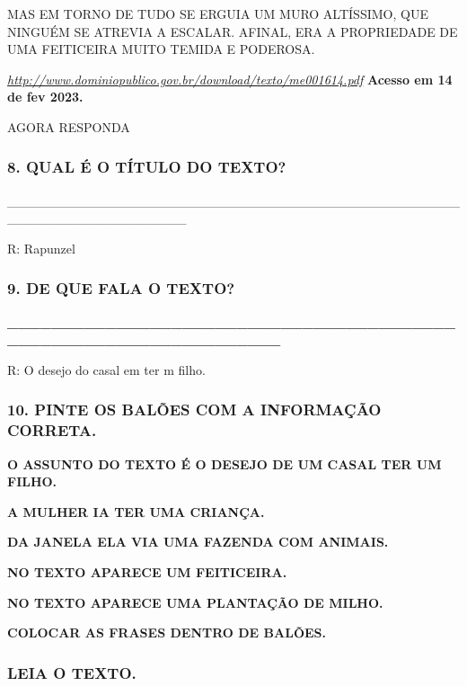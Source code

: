 MAS EM TORNO DE TUDO SE ERGUIA UM MURO ALTÍSSIMO, QUE NINGUÉM SE ATREVIA
A ESCALAR. AFINAL, ERA A PROPRIEDADE DE UMA FEITICEIRA MUITO TEMIDA E
PODEROSA.

\href{http://www.dominiopublico.gov.br/download/texto/me001614.pdf}{\emph{http://www.dominiopublico.gov.br/download/texto/me001614.pdf}}
\textbf{Acesso em 14 de fev 2023.}

AGORA RESPONDA\protect\hypertarget{_heading=h.4pnvitxnujbb}{}{}

\subsubsection{8. QUAL É O TÍTULO DO
TEXTO?}\label{qual-uxe9-o-tuxedtulo-do-texto}

\_\_\_\_\_\_\_\_\_\_\_\_\_\_\_\_\_\_\_\_\_\_\_\_\_\_\_\_\_\_\_\_\_\_\_\_\_\_\_\_\_\_\_\_\_\_\_\_\_\_\_\_\_\_\_\_\_\_\_\_\_\_\_\_\_\_\_

R: Rapunzel

\subsubsection{9. DE QUE FALA O TEXTO?}\label{de-que-fala-o-texto}

\textbf{\_\_\_\_\_\_\_\_\_\_\_\_\_\_\_\_\_\_\_\_\_\_\_\_\_\_\_\_\_\_\_\_\_\_\_\_\_\_\_\_\_\_\_\_\_\_\_\_\_\_\_\_\_\_\_\_\_\_\_\_\_\_\_\_\_\_}

R: O desejo do casal em ter m filho.

\subsubsection{10. PINTE OS BALÕES COM A INFORMAÇÃO
CORRETA.}\label{pinte-os-baluxf5es-com-a-informauxe7uxe3o-correta.}

\textbf{O ASSUNTO DO TEXTO É O DESEJO DE UM CASAL TER UM FILHO.}

\textbf{A MULHER IA TER UMA CRIANÇA.}

\textbf{DA JANELA ELA VIA UMA FAZENDA COM ANIMAIS.}

\textbf{NO TEXTO APARECE UM FEITICEIRA.}

\textbf{NO TEXTO APARECE UMA PLANTAÇÃO DE MILHO.}

\textbf{COLOCAR AS FRASES DENTRO DE BALÕES.}

\subsubsection{LEIA O TEXTO.}\label{leia-o-texto.-2}

